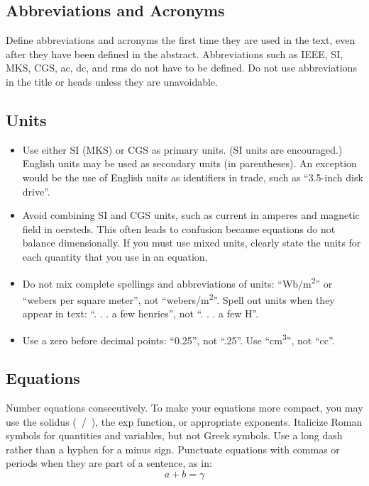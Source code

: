 \documentclass[conference]{IEEEtran}
\begin{document}
\subsection{Abbreviations and Acronyms}\label{AA}
Define abbreviations and acronyms the first time they are used in the text, 
even after they have been defined in the abstract. Abbreviations such as 
IEEE, SI, MKS, CGS, ac, dc, and rms do not have to be defined. Do not use 
abbreviations in the title or heads unless they are unavoidable.

\subsection{Units}
\begin{itemize}
\item Use either SI (MKS) or CGS as primary units. (SI units are encouraged.) English units may be used as secondary units (in parentheses). An exception would be the use of English units as identifiers in trade, such as ``3.5-inch disk drive''.
\item Avoid combining SI and CGS units, such as current in amperes and magnetic field in oersteds. This often leads to confusion because equations do not balance dimensionally. If you must use mixed units, clearly state the units for each quantity that you use in an equation.
\item Do not mix complete spellings and abbreviations of units: ``Wb/m\textsuperscript{2}'' or ``webers per square meter'', not ``webers/m\textsuperscript{2}''. Spell out units when they appear in text: ``. . . a few henries'', not ``. . . a few H''.
\item Use a zero before decimal points: ``0.25'', not ``.25''. Use ``cm\textsuperscript{3}'', not ``cc''.
\end{itemize}

\subsection{Equations}
Number equations consecutively. To make your 
equations more compact, you may use the solidus (~/~), the exp function, or 
appropriate exponents. Italicize Roman symbols for quantities and variables, 
but not Greek symbols. Use a long dash rather than a hyphen for a minus 
sign. Punctuate equations with commas or periods when they are part of a 
sentence, as in:
\begin{equation}
a+b=\gamma\label{eq}
\end{equation}
\end{document}
